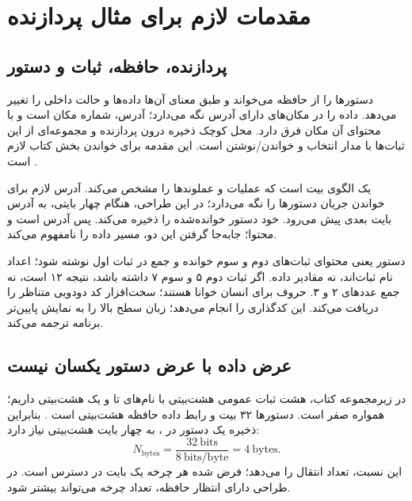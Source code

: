 \section{مقدمات لازم برای مثال پردازنده }
\subsection{پردازنده، حافظه، ثبات و دستور}
 دستورها را از حافظه می‌خواند و طبق معنای آن‌ها داده‌ها و
حالت داخلی را تغییر می‌دهد.  داده را در مکان‌های دارای آدرس نگه می‌دارد؛
آدرس، شماره مکان است و با محتوای آن مکان فرق دارد.
 محل کوچک ذخیره درون پردازنده و 
مجموعه‌ای از این ثبات‌ها با مدار انتخاب و خواندن/نوشتن است.
این مقدمه برای خواندن بخش  کتاب لازم است \cite{weste}.

 یک الگوی بیت است که عملیات و عملوندها را مشخص می‌کند.
 آدرس لازم برای خواندن جریان دستورها را نگه می‌دارد؛
در این طراحی، هنگام چهار  بایتی، به آدرس بایت بعدی پیش می‌رود.
 خود دستور خوانده‌شده را ذخیره می‌کند.
پس  آدرس است و  محتوا؛ جابه‌جا گرفتن این دو، مسیر داده را نامفهوم می‌کند.

دستور  یعنی محتوای ثبات‌های دوم و سوم خوانده و
جمع در ثبات اول نوشته شود؛ اعداد نام ثبات‌اند، نه مقادیر داده.
اگر ثبات دوم ۵ و سوم ۷ داشته باشد، نتیجه ۱۲ است، نه جمع عددهای ۲ و ۳.
حروف  برای انسان خوانا هستند؛ سخت‌افزار کد دودویی متناظر را دریافت می‌کند.
 این کدگذاری را انجام می‌دهد؛  زبان سطح بالا را
به نمایش پایین‌تر برنامه ترجمه می‌کند.

\subsection{عرض داده با عرض دستور یکسان نیست}
در زیرمجموعه کتاب، هشت ثبات عمومی هشت‌بیتی با نام‌های  تا 
و یک  هشت‌بیتی داریم؛  همواره صفر است.
دستورها ۳۲ بیت و رابط داده حافظه هشت‌بیتی است
\cite[بخش ]{weste}.
بنابراین ذخیره یک دستور در ، به چهار بایت هشت‌بیتی نیاز دارد:
\begin{equation*}
N_{\mathrm{bytes}}=\frac{32\ \mathrm{bits}}{8\ \mathrm{bits/byte}}=4\ \mathrm{bytes}.
\end{equation*}
این نسبت، تعداد انتقال را می‌دهد؛ فرض شده هر چرخه یک بایت در دسترس است.
در طراحی دارای انتظار حافظه، تعداد چرخه می‌تواند بیشتر شود.


